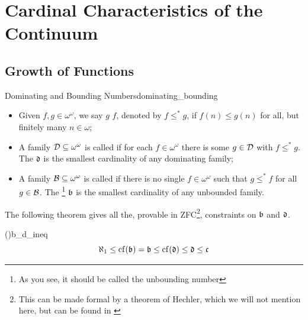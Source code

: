 \chapter{Cardinal Characteristics of the Continuum}

\section{Growth of Functions}

\begin{definition}{Dominating and Bounding Numbers}{dominating_bounding}
    \begin{itemize}
        \item Given $f,g\in\omega^\omega$, we say $g$  $f$, denoted by $f\leq^*g$, if $f(n)\leq g(n)$ for all, but finitely many $n\in\omega$;
        \item A family $\mathcal{D}\subseteq\omega^\omega$ is called  if for each $f\in\omega^\omega$ there is some $g\in\mathcal{D}$ with $f\leq^*g$. The  $\mathfrak{d}$ is the smallest cardinality of any dominating family;
        \item A family $\mathcal{B}\subseteq\omega^\omega$ is called  if there is no single $f\in\omega^\omega$ such that $g\leq^*f$ for all $g\in\mathcal{B}$. The \footnote{As you see, it should be called the unbounding number} $\mathfrak{b}$ is the smallest cardinality of any unbounded family.
    \end{itemize}
\end{definition}

The following theorem gives all the, provable in ZFC\footnote{This can be made formal by a theorem of Hechler, which we will not mention here, but can be found in \cite{blass}}, constraints on $\mathfrak{b}$ and $\mathfrak{d}$.

\begin{theorem}{(\cite{handbook})}{b_d_ineq}
    $$\aleph_1\leq\mathrm{cf}\!\left(\mathfrak{b}\right)=\mathfrak{b}\leq\mathrm{cf}\!\left(\mathfrak{d}\right)\leq\mathfrak{d}\leq\mathfrak{c}$$
\end{theorem}


